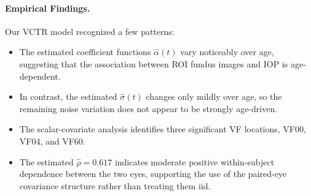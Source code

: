 \documentclass[10pt]{notes}
\begin{document}
\paragraph{Empirical Findings.} Our VCTR model recognized a few patterns:
\begin{itemize}
    \item The estimated coefficient functions $\hat{\alpha}(t)$ vary noticeably over age, suggesting that the association between ROI fundus images and IOP is age-dependent.
    \item In contrast, the estimated $\hat{\sigma}(t)$ changes only mildly over age, so the remaining noise variation does not appear to be strongly age-driven.
    \item The scalar-covariate analysis identifies three significant VF locations, VF00, VF04, and VF60.
    \item The estimated $\hat{\rho}=0.617$ indicates moderate
    positive within-subject dependence between the two eyes, supporting the use
    of the paired-eye covariance structure rather than treating them iid.
\end{itemize}





\end{document}
